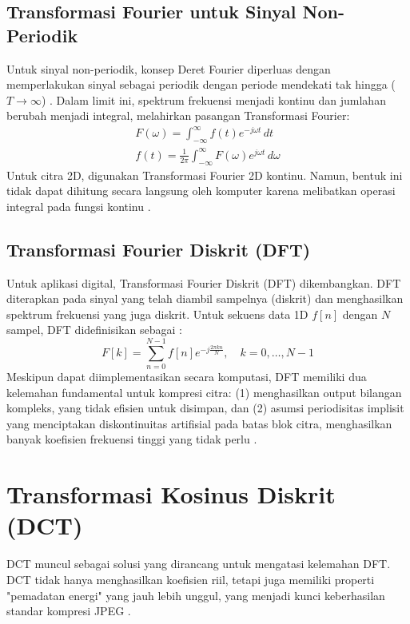 \documentclass[a4paper]{article}
\begin{document}
\subsection{Transformasi Fourier untuk Sinyal Non-Periodik}
Untuk sinyal non-periodik, konsep Deret Fourier diperluas dengan memperlakukan sinyal sebagai periodik dengan periode mendekati tak hingga ($T \to \infty$) \cite{bracewell1999fourier}. Dalam limit ini, spektrum frekuensi menjadi kontinu dan jumlahan berubah menjadi integral, melahirkan pasangan Transformasi Fourier:
\begin{gather}
  F(\omega) = \int_{-\infty}^{\infty} f(t) e^{-j\omega t} \,dt \label{eq:ft_forward} \\
  f(t) = \frac{1}{2\pi} \int_{-\infty}^{\infty} F(\omega) e^{j\omega t} \,d\omega \label{eq:ft_inverse}
\end{gather}
Untuk citra 2D, digunakan Transformasi Fourier 2D kontinu. Namun, bentuk ini tidak dapat dihitung secara langsung oleh komputer karena melibatkan operasi integral pada fungsi kontinu \cite{oppenheim1996signals}.

\subsection{Transformasi Fourier Diskrit (DFT)}
Untuk aplikasi digital, Transformasi Fourier Diskrit (DFT) dikembangkan. DFT diterapkan pada sinyal yang telah diambil sampelnya (diskrit) dan menghasilkan spektrum frekuensi yang juga diskrit. Untuk sekuens data 1D $f[n]$ dengan $N$ sampel, DFT didefinisikan sebagai \cite{oppenheim1996signals}:
\begin{equation} \label{eq:dft_1d}
  F[k] = \sum_{n=0}^{N-1} f[n] e^{-j\frac{2\pi kn}{N}}, \quad k = 0, \dots, N-1
\end{equation}
Meskipun dapat diimplementasikan secara komputasi, DFT memiliki dua kelemahan fundamental untuk kompresi citra: (1) menghasilkan output bilangan kompleks, yang tidak efisien untuk disimpan, dan (2) asumsi periodisitas implisit yang menciptakan diskontinuitas artifisial pada batas blok citra, menghasilkan banyak koefisien frekuensi tinggi yang tidak perlu \cite{ucsd_dct_notes}.

\section{Transformasi Kosinus Diskrit (DCT)}
DCT muncul sebagai solusi yang dirancang untuk mengatasi kelemahan DFT. DCT tidak hanya menghasilkan koefisien riil, tetapi juga memiliki properti "pemadatan energi" yang jauh lebih unggul, yang menjadi kunci keberhasilan standar kompresi JPEG \cite{wallace1991jpeg}.
\end{document}

